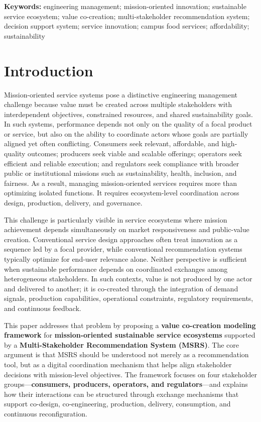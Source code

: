 \documentclass[
  letterpaper,
  DIV=11,
  numbers=noendperiod]{scrartcl}
\begin{document}
\textbf{Keywords:} engineering management; mission-oriented innovation;
sustainable service ecosystem; value co-creation; multi-stakeholder
recommendation system; decision support system; service innovation;
campus food services; affordability; sustainability

\section{Introduction}\label{introduction}

Mission-oriented service systems pose a distinctive engineering
management challenge because value must be created across multiple
stakeholders with interdependent objectives, constrained resources, and
shared sustainability goals. In such systems, performance depends not
only on the quality of a focal product or service, but also on the
ability to coordinate actors whose goals are partially aligned yet often
conflicting. Consumers seek relevant, affordable, and high-quality
outcomes; producers seek viable and scalable offerings; operators seek
efficient and reliable execution; and regulators seek compliance with
broader public or institutional missions such as sustainability, health,
inclusion, and fairness. As a result, managing mission-oriented services
requires more than optimizing isolated functions. It requires
ecosystem-level coordination across design, production, delivery, and
governance.

This challenge is particularly visible in service ecosystems where
mission achievement depends simultaneously on market responsiveness and
public-value creation. Conventional service design approaches often
treat innovation as a sequence led by a focal provider, while
conventional recommendation systems typically optimize for end-user
relevance alone. Neither perspective is sufficient when sustainable
performance depends on coordinated exchanges among heterogeneous
stakeholders. In such contexts, value is not produced by one actor and
delivered to another; it is co-created through the integration of demand
signals, production capabilities, operational constraints, regulatory
requirements, and continuous feedback.

This paper addresses that problem by proposing a \textbf{value
co-creation modeling framework} for \textbf{mission-oriented sustainable
service ecosystems} supported by a \textbf{Multi-Stakeholder
Recommendation System (MSRS)}. The core argument is that MSRS should be
understood not merely as a recommendation tool, but as a digital
coordination mechanism that helps align stakeholder decisions with
mission-level objectives. The framework focuses on four stakeholder
groups---\textbf{consumers, producers, operators, and regulators}---and
explains how their interactions can be structured through exchange
mechanisms that support co-design, co-engineering, production, delivery,
consumption, and continuous reconfiguration.
\end{document}

